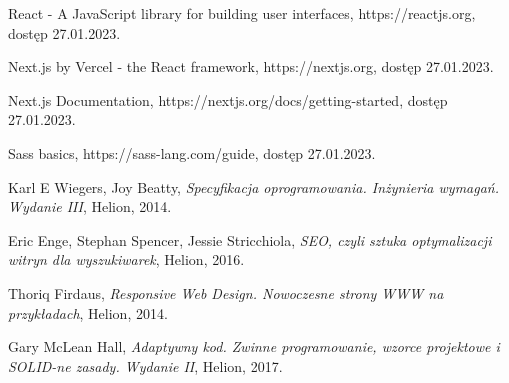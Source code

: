 \documentclass[a4paper, 12pt]{article}
\numberwithin{figure}{section}
\begin{document}
\begin{sloppypar}
\begin{thebibliography}{99}
    React - A JavaScript library for building user interfaces,
    {https://reactjs.org},
    dostęp 27.01.2023.

    Next.js by Vercel - the React framework,
    {https://nextjs.org},
    dostęp 27.01.2023. 

    Next.js Documentation,
    {https://nextjs.org/docs/getting-started},
    dostęp 27.01.2023.

    Sass basics,
    {https://sass-lang.com/guide},
    dostęp 27.01.2023.

    Karl E Wiegers, Joy Beatty,
    \textit{Specyfikacja oprogramowania. Inżynieria wymagań. Wydanie III},
    Helion,
    2014.
    
    Eric Enge, Stephan Spencer, Jessie Stricchiola,
    \textit{SEO, czyli sztuka optymalizacji witryn dla wyszukiwarek},
    Helion,
    2016.

    Thoriq Firdaus,
    \textit{Responsive Web Design. Nowoczesne strony WWW na przykładach},
    Helion, 
    2014.

    Gary McLean Hall,
    \textit{Adaptywny kod. Zwinne programowanie, wzorce projektowe i SOLID-ne zasady. Wydanie II},
    Helion,
    2017.

        
\end{thebibliography}

\end{sloppypar}
\end{document}
